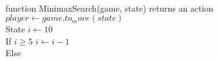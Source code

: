 \documentclass[preview]{standalone}
\begin{document}
\begin{center}
\begin{algorithmic}
            \\function MinimaxSearch(game, state) returns an action
            \\$player \gets game.to_move(state)$
            \\State $i \gets 10$ 
            \\If {$i\geq 5$}
                \State $i \gets i-1$
            \\Else
            \end{algorithmic}
\end{center}
\end{document}
